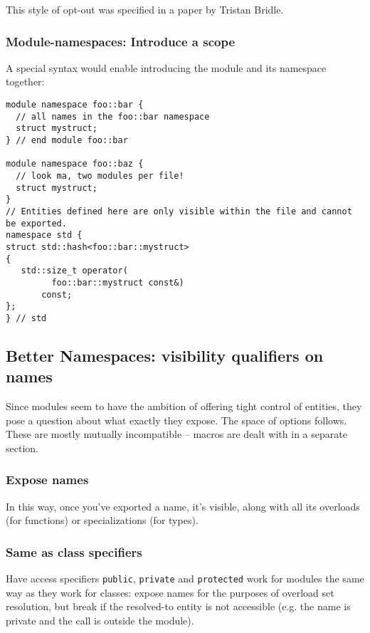 \documentclass[reqno]{article}
\begin{document}
This style of opt-out was specified in a paper by Tristan Bridle.~\citep{P0665R0}


\subsubsection{Module-namespaces: Introduce a scope}

A special syntax would enable introducing the module and its namespace together:

\begin{verbatim}
module namespace foo::bar {
  // all names in the foo::bar namespace
  struct mystruct;
} // end module foo::bar

module namespace foo::baz {
  // look ma, two modules per file!
  struct mystruct;
}
// Entities defined here are only visible within the file and cannot be exported.
namespace std {
struct std::hash<foo::bar::mystruct>
{
   std::size_t operator(
         foo::bar::mystruct const&)
       const;
};
} // std
\end{verbatim}


\subsection{Better Namespaces: visibility qualifiers on names}

Since modules seem to have the ambition of offering tight control of entities,
they pose a question about what exactly they expose. The space of options
follows. These are mostly mutually incompatible -- macros are dealt with in a
separate section.


\subsubsection{Expose names}

In this way, once you've exported a name, it's visible, along with all its
overloads (for functions) or specializations (for types).


\subsubsection{Same as class specifiers}

Have access specifiers \texttt{public}, \texttt{private} and \texttt{protected}
work for modules the same way as they work for classes: expose names for the
purposes of overload set resolution, but break if the resolved-to entity is
not accessible (e.g. the name is private and the call is outside the module).
\end{document}
